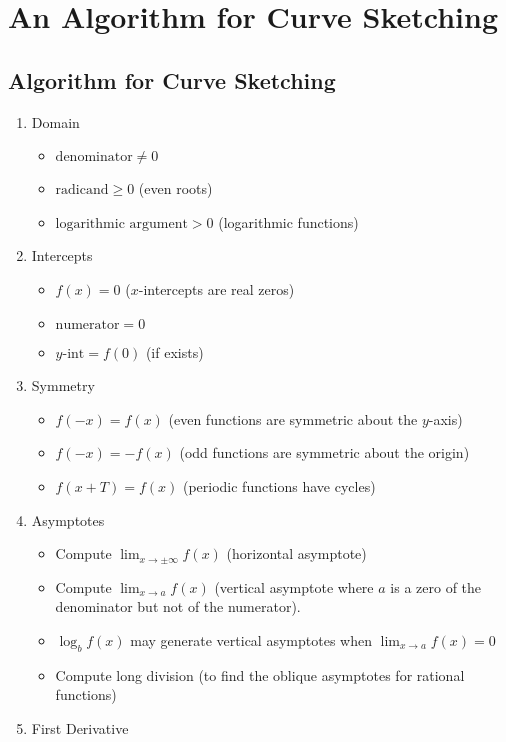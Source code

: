 \section{An Algorithm for Curve Sketching}
\subsection{Algorithm for Curve Sketching}
	\begin{enumerate}
		\item Domain
			\begin{itemize}
				\item $\text{denominator} \neq 0$
				\item $\text{radicand} \geq 0$ (even roots)
				\item $\text{logarithmic argument} > 0$ (logarithmic functions)
			\end{itemize}
		\item Intercepts
			\begin{itemize}
				\item $f(x) = 0$ ($x$-intercepts are real zeros)
				\item $\text{numerator} = 0$
				\item $y\text{-int} = f(0)$ (if exists)
			\end{itemize}
		\item Symmetry
			\begin{itemize}
				\item $f(-x) = f(x)$ (even functions are symmetric about the $y$-axis)
				\item $f(-x) = -f(x)$ (odd functions are symmetric about the origin)
				\item $f(x+T) = f(x)$ (periodic functions have cycles)
			\end{itemize}
		\item Asymptotes
			\begin{itemize}
				\item Compute $\displaystyle\lim_{x \to \pm\infty} f(x)$ (horizontal asymptote)
				\item Compute $\displaystyle\lim_{x \to a} f(x)$ (vertical asymptote where $a$ is a zero of the denominator but not of the numerator).
				\item $\log_b f(x)$ may generate vertical asymptotes when $\displaystyle \lim_{x \to a} f(x) = 0$
				\item Compute long division (to find the oblique asymptotes for rational functions)
			\end{itemize}
		\item First Derivative

\end{enumerate}
